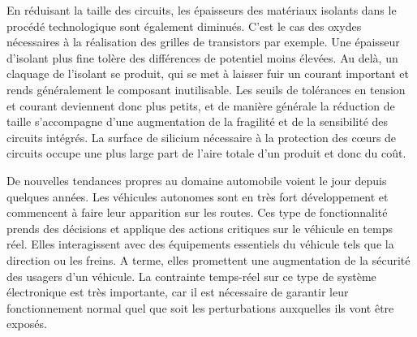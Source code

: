 En réduisant la taille des circuits, les épaisseurs des matériaux isolants dans le procédé technologique sont également diminués.
C'est le cas des oxydes nécessaires à la réalisation des grilles de transistors par exemple.
Une épaisseur d'isolant plus fine tolère des différences de potentiel moins élevées.
Au delà, un claquage de l'isolant se produit, qui se met à laisser fuir un courant important et rends généralement le composant inutilisable.
Les seuils de tolérances en tension et courant deviennent donc plus petits, et de manière générale la réduction de taille s'accompagne d'une augmentation de la fragilité et de la sensibilité des circuits intégrés.
La surface de silicium nécessaire à la protection des cœurs de circuits occupe une plus large part de l'aire totale d'un produit  \cite{evolution_technologies} et donc du coût.

De nouvelles tendances propres au domaine automobile voient le jour depuis quelques années.
Les véhicules autonomes sont en très fort développement et commencent à faire leur apparition sur les routes.
Ces type de fonctionnalité prends des décisions et applique des actions critiques sur le véhicule en temps réel.
Elles interagissent avec des équipements essentiels du véhicule tels que la direction ou les freins.
A terme, elles promettent une augmentation de la sécurité des usagers d'un véhicule.
La contrainte temps-réel sur ce type de système électronique est très importante, car il est nécessaire de garantir leur fonctionnement normal quel que soit les perturbations auxquelles ils vont être exposés.

